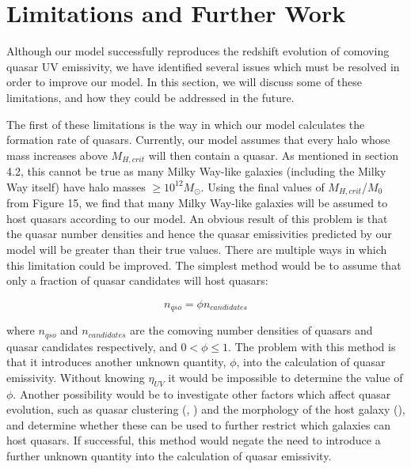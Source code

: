 \documentclass[12pt, twocolumn]{article}%
\begin{document}
\section{Limitations and Further Work}

Although our model successfully reproduces the redshift evolution of comoving quasar UV emissivity, we have identified several issues which must be resolved in order to improve our model. In this section, we will discuss some of these limitations, and how they could be addressed in the future.\par

The first of these limitations is the way in which our model calculates the formation rate of quasars. Currently, our model assumes that every halo whose mass increases above $M_{H,crit}$ will then contain a quasar. As mentioned in section 4.2, this cannot be true as many Milky Way-like galaxies (including the Milky Way itself) have halo masses $\geq10^{12}M_\odot$. Using the final values of $M_{H,crit}$/$M_0$ from Figure 15, we find that many Milky Way-like galaxies will be assumed to host quasars according to our model. An obvious result of this problem is that the quasar number densities and hence the quasar emissivities predicted by our model will be greater than their true values. There are multiple ways in which this limitation could be improved. The simplest method would be to assume that only a fraction of quasar candidates will host quasars:

\begin{equation}
    n_{qso}=\phi n_{candidates}
\end{equation}

\noindent where $n_{qso}$ and $n_{candidates}$ are the comoving number densities of quasars and quasar candidates respectively, and $0<\phi\leq1$. The problem with this method is that it introduces another unknown quantity, $\phi$, into the calculation of quasar emissivity. Without knowing $\eta_{UV}$ it would be impossible to determine the value of $\phi$. Another possibility would be to investigate other factors which affect quasar evolution, such as quasar clustering (\cite{Clustering_1}, \cite{Clustering_2}) and the morphology of the host galaxy (\cite{Morphology}), and determine whether these can be used to further restrict which galaxies can host quasars. If successful, this method would negate the need to introduce a further unknown quantity into the calculation of quasar emissivity.\par
\end{document}
